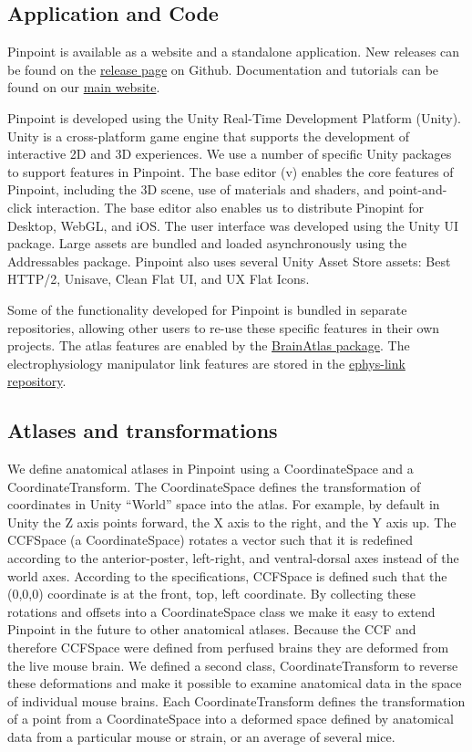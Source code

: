 \subsection{Application and Code}

Pinpoint is available as a website and a standalone application. New releases can be found on the \href{https://github.com/VirtualBrainLab/Pinpoint/releases}{release page} on Github. Documentation and tutorials can be found on our \href{https://virtualbrainlab.org/pinpoint/installation_and_use.html}{main website}. 

Pinpoint is developed using the Unity Real-Time Development Platform (Unity). Unity is a cross-platform game engine that supports the development of interactive 2D and 3D experiences. We use a number of specific Unity packages to support features in Pinpoint. The base editor (v\ueditor) enables the core features of Pinpoint, including the 3D scene, use of materials and shaders, and point-and-click interaction. The base editor also enables us to distribute Pinopint for Desktop, WebGL, and iOS. The user interface was developed using the Unity UI package. Large assets are bundled and loaded asynchronously using the Addressables package. Pinpoint also uses several Unity Asset Store assets: Best HTTP/2, Unisave, Clean Flat UI, and UX Flat Icons.

Some of the functionality developed for Pinpoint is bundled in separate repositories, allowing other users to re-use these specific features in their own projects. The atlas features are enabled by the \href{https://github.com/VirtualBrainLab/BrainAtlas}{BrainAtlas package}. The electrophysiology manipulator link features are stored in the \href{https://github.com/VirtualBrainLab/ephys-link}{ephys-link repository}.

\subsection{Atlases and transformations}

We define anatomical atlases in Pinpoint using a CoordinateSpace and a CoordinateTransform. The CoordinateSpace defines the transformation of coordinates in Unity ``World'' space into the atlas. For example, by default in Unity the Z axis points forward, the X axis to the right, and the Y axis up. The CCFSpace (a CoordinateSpace) rotates a vector such that it is redefined according to the anterior-poster, left-right, and ventral-dorsal axes instead of the world axes. According to the specifications, CCFSpace is defined such that the (0,0,0) coordinate is at the front, top, left coordinate. By collecting these rotations and offsets into a CoordinateSpace class we make it easy to extend Pinpoint in the future to other anatomical atlases. Because the CCF and therefore CCFSpace were defined from perfused brains they are deformed from the live mouse brain. We defined a second class, CoordinateTransform to reverse these deformations and make it possible to examine anatomical data in the space of individual mouse brains. Each CoordinateTransform defines the transformation of a point from a CoordinateSpace into a deformed space defined by anatomical data from a particular mouse or strain, or an average of several mice.

